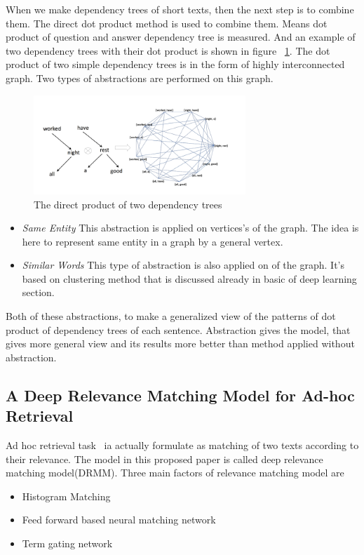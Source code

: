 \documentclass{doublecol-new}
\theoremstyle{TH}{
\newtheorem{lemma}{Lemma}
\newtheorem{theorem}[lemma]{Theorem}
\newtheorem{corrolary}[lemma]{Corrolary}
\newtheorem{conjecture}[lemma]{Conjecture}
\newtheorem{proposition}[lemma]{Proposition}
\newtheorem{claim}[lemma]{Claim}
\newtheorem{stheorem}[lemma]{Wrong Theorem}
\newtheorem{algorithm}{Algorithm}
}
\theoremstyle{THrm}{
\newtheorem{definition}{Definition}[section]
\newtheorem{question}{Question}[section]
\newtheorem{remark}{Remark}
\newtheorem{scheme}{Scheme}
}
\theoremstyle{THhit}{
\newtheorem{case}{Case}[section]
}
\begin{document}
When we make dependency trees of short texts, then the next step is to combine them. The direct dot product method is used to combine them. Means dot product of question and answer dependency tree is measured. And an example of two dependency trees with their dot product is shown in figure ~\ref{fig:product-dt}. The dot product of two simple dependency trees is in the form of highly interconnected graph. Two types of abstractions are performed on this graph. 
\begin{figure}[h]
	\centerline{\includegraphics[width=8cm,keepaspectratio]{image/product-dt.PNG}}
	\caption{The direct product of two dependency trees}
	\label{fig:product-dt}
\end{figure} 

\begin{itemize}
	\item{\em Same Entity} This abstraction is applied on vertices's of the graph. The idea is here to represent same entity in a graph by a general vertex.  
	\item{\em Similar Words} This type of abstraction is also applied on  of the graph. It's based on clustering method that is discussed already in basic of deep learning section. 
\end{itemize}
Both of these abstractions, to make a generalized view of the patterns of dot product of dependency trees of each sentence. Abstraction gives the model, that gives more general view and its results more better than method applied without abstraction.

\subsection{A Deep Relevance Matching Model for Ad-hoc Retrieval}


Ad hoc retrieval task~\cite{guo2016deep} ia actually formulate as matching of two texts according to their relevance. The model in this proposed paper is called deep relevance matching model(DRMM). Three main factors of relevance matching model are
\begin{itemize}
	\item Histogram Matching
	\item  Feed forward based neural matching network
	\item  Term gating network
\end{itemize}
\end{document}
